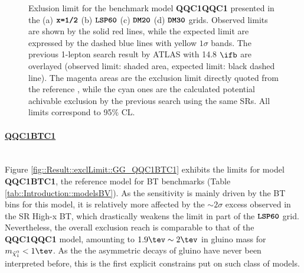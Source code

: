 \clearpage
\begin{figure}[h]
  \centering
    \caption{
    Exlusion limit for the benchmark model \textbf{QQC1QQC1} presented in the (a) $\mathrm{\textbf{\texttt{x=1/2}}}$ (b) $\mathrm{\textbf{\texttt{LSP60}}}$ (c) $\mathrm{\textbf{\texttt{DM20}}}$ (d) $\mathrm{\textbf{\texttt{DM30}}}$ grids. Observed limits are shown by the solid red lines, while the expected limit are expressed by the dashed blue lines with yellow $1\sigma$ bands. 
The previous 1-lepton search result by ATLAS with 14.8 $\ifb$ \cite{strong1L_ICHEP2016_CONF} are overlayed (observed limit: shaded area, expected limit: black dashed line). 
The magenta areas are the exclusion limit directly quoted from the reference \cite{strong1L_ICHEP2016_CONF}, while the cyan ones are the calculated potential achivable exclusion by the previous search using the same SRs.
All limits correspond to 95$\%$ CL.
  \label{fig::Result::exclLimit::GG_onestepCC} }
\end{figure}

\clearpage
\paragraph{\underline{\textbf{QQC1BTC1}}} \mbox{} \\
Figure \ref{fig::Result::exclLimit::GG_QQC1BTC1} exhibits the limits for model \textbf{QQC1BTC1}, the reference model for BT benchmarks (Table \ref{tab::Introduction::modelsBV}). As the sensitivity is mainly driven by the BT bins for this model, it is relatively more affected by the $\sim 2\sigma$ excess observed in the SR High-x BT, which drastically weakens the limit in part of the $\mathrm{\textbf{\texttt{LSP60}}}$ grid. Nevertheless, the overall exclusion reach is comparable to that of the \textbf{QQC1QQC1} model, amounting to $1.9\tev\sim2\tev$ in gluino mass for $\mLSP <1\tev$. As the the asymmetric decays of gluino have never been interpreted before, this is the first explicit constrains put on such class of models. \\

